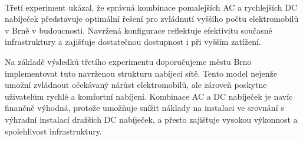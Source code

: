 \documentclass[a4paper,11pt]{article}
\begin{document}
\paragraph{}
Třetí experiment ukázal, že správná kombinace pomalejších AC a rychlejších DC nabíječek představuje optimální řešení
pro zvládnutí vyššího počtu elektromobilů v Brně v budoucnosti. Navržená konfigurace reflektuje efektivitu současné
infrastruktury a zajišťuje dostatečnou dostupnost i při vyšším zatížení.

Na základě výsledků třetího experimentu doporučujeme městu Brno implementovat tuto navrženou strukturu nabíjecí sítě.
Tento model nejenže umožní zvládnout očekávaný nárůst elektromobilů, ale zároveň poskytne uživatelům rychlé a komfortní
nabíjení. Kombinace AC a DC nabíječek je navíc finančně výhodná, protože umožňuje snížit náklady na instalaci ve srovnání
s výhradní instalací dražších DC nabíječek, a přesto zajišťuje vysokou výkonnost a spolehlivost infrastruktury.

\newpage


\label{sec:zdroje}
\end{document}
